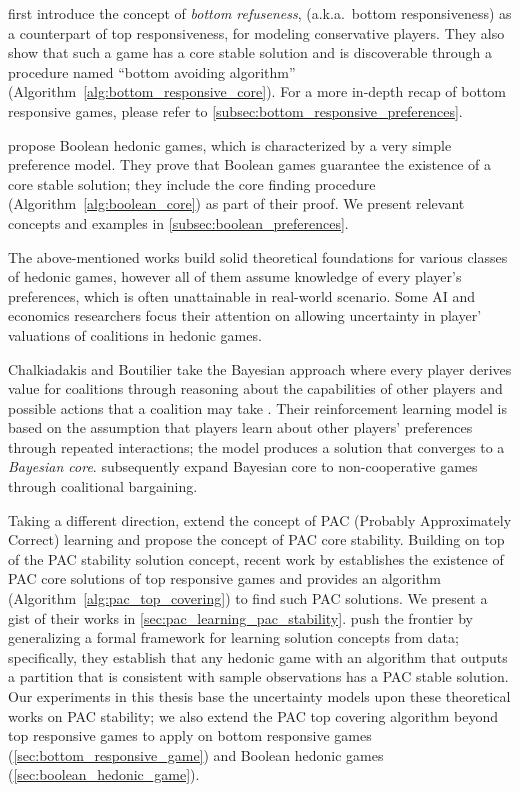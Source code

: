  first introduce the concept of \textit{bottom refuseness},
(a.k.a.\ bottom responsiveness) as a counterpart of top responsiveness, for
modeling conservative players.
They also show that such a game has a core stable solution and is discoverable
through a procedure named ``bottom avoiding algorithm''
(Algorithm~\ref{alg:bottom_responsive_core}).
For a more in-depth recap of bottom responsive games, please refer to
\autoref{subsec:bottom_responsive_preferences}.

 propose Boolean hedonic games,
which is characterized by a very simple preference model.
They prove that Boolean games guarantee the existence of a core stable solution;
they include the core finding procedure (Algorithm~\ref{alg:boolean_core}) as
part of their proof.
We present relevant concepts and examples in
\autoref{subsec:boolean_preferences}.

The above-mentioned works build solid theoretical foundations for various
classes of hedonic games, however all of them assume knowledge of every
player's preferences, which is often unattainable in real-world scenario.
Some AI and economics researchers focus their attention on allowing uncertainty
in player' valuations of coalitions in hedonic games.

Chalkiadakis and Boutilier take the Bayesian approach where every player derives
value for coalitions through reasoning about the capabilities of other players
and possible actions that a coalition may take
\cite{Chalkiadakis2004, Chalkiadakis:2008:SDM:1402383.1402435}.
Their reinforcement learning model is based on the assumption that players
learn about other players' preferences through repeated interactions; the model
produces a solution that converges to a \textit{Bayesian core}.
 subsequently expand Bayesian core to
non-cooperative games through coalitional bargaining.

Taking a different direction, 
extend the concept of PAC (Probably Approximately Correct) learning and
propose the concept of PAC core stability.
Building on top of the PAC stability solution concept, recent work by
 establishes the existence of PAC core solutions
of top responsive games and provides an algorithm
(Algorithm~\ref{alg:pac_top_covering}) to find such PAC solutions.
We present a gist of their works in \autoref{sec:pac_learning_pac_stability}.
 push the frontier by generalizing a formal
framework for learning solution concepts from data; specifically, they
establish that any hedonic game with an algorithm that outputs a partition
that is consistent with sample observations has a PAC stable solution.
Our experiments in this thesis base the uncertainty models upon these theoretical
works on PAC stability; we also extend the PAC top covering algorithm beyond
top responsive games to apply on bottom responsive games
(\autoref{sec:bottom_responsive_game}) and Boolean hedonic games
 (\autoref{sec:boolean_hedonic_game}).

